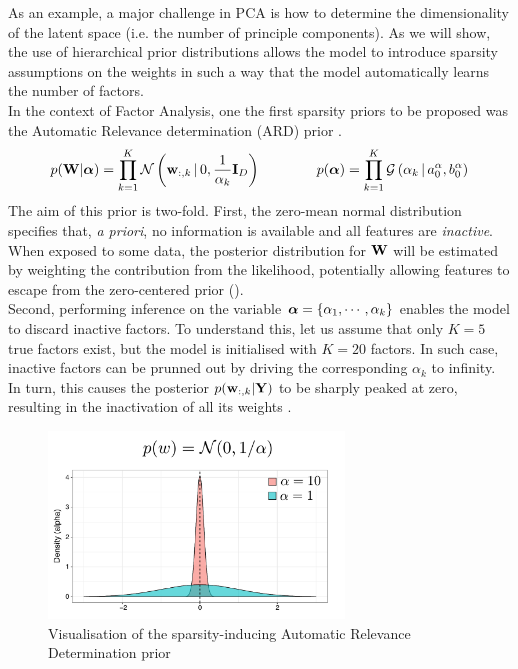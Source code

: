 As an example, a major challenge in PCA is how to determine the dimensionality of the latent space (i.e. the number of principle components). As we will show, the use of hierarchical prior distributions allows the model to introduce sparsity assumptions on the weights in such a way that the model automatically learns the number of factors.\\
In the context of Factor Analysis, one the first sparsity priors to be proposed was the Automatic Relevance determination (ARD) prior \cite{Neal1995,Mackay1996,Bishop1999a,Bishop1999b}. 
\begin{equation*} \label{eq:ard}
	p({\bf W}|\mbox{\boldmath $\alpha$}) = \prod_{k=1}^{K} \mathcal{N}\left({\bf w}_{:,k} \,|\, 0,\frac{1}{\alpha_{k}}{\bf I}_{D}\right) \\
	\qquad\qquad
	p(\mbox{\boldmath $\alpha$}) = \prod_{k=1}^{K} \mathcal{G}\left(\alpha_k \,|\, a_0^\alpha, b_0^\alpha\right)
\end{equation*}
The aim of this prior is two-fold. First, the zero-mean normal distribution specifies that, \textit{a priori}, no information is available and all features are \textit{inactive}. When exposed to some data, the posterior distribution for ${\bf W}$ will be estimated by weighting the contribution from the likelihood, potentially allowing features to escape from the zero-centered prior ().\\
Second, performing inference on the variable $\mbox{\boldmath $\alpha$} = \{ \alpha_1, \cdots, \alpha_k \}$ enables the model to discard inactive factors. To understand this, let us assume that only $K=5$ true factors exist, but the model is initialised with $K=20$ factors. In such case, inactive factors can be prunned out by driving the corresponding $\alpha_k$ to infinity. In turn, this causes the posterior $p({\bf w}_{:,k}|{\bf Y})$ to be sharply peaked at zero, resulting in the inactivation of all its weights .

\begin{figure}[H] \begin{center}
	\includegraphics[width=0.7\textwidth]{Chapter2/Figs/ard}
	\caption{Visualisation of the sparsity-inducing Automatic Relevance Determination prior}
	\label{fig:ard}
\end{center} \end{figure}

